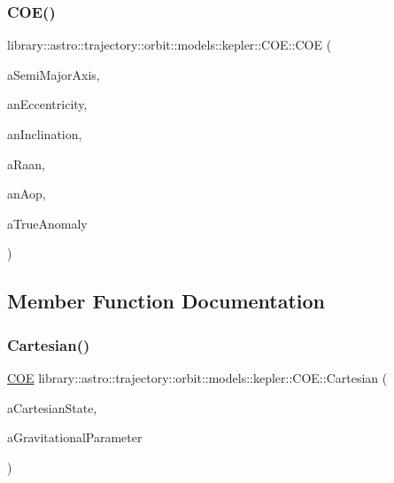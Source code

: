 \subsubsection{\texorpdfstring{C\+O\+E()}{COE()}}
{\footnotesize\ttfamily library\+::astro\+::trajectory\+::orbit\+::models\+::kepler\+::\+C\+O\+E\+::\+C\+OE (\begin{DoxyParamCaption}\item[{const Length \&}]{a\+Semi\+Major\+Axis,  }\item[{const Real \&}]{an\+Eccentricity,  }\item[{const Angle \&}]{an\+Inclination,  }\item[{const Angle \&}]{a\+Raan,  }\item[{const Angle \&}]{an\+Aop,  }\item[{const Angle \&}]{a\+True\+Anomaly }\end{DoxyParamCaption})}



\subsection{Member Function Documentation}
\mbox{\label{classlibrary_1_1astro_1_1trajectory_1_1orbit_1_1models_1_1kepler_1_1_c_o_e_a776a2b7587c3505cf1e063a338c4a5c6}} 
\subsubsection{\texorpdfstring{Cartesian()}{Cartesian()}}
{\footnotesize\ttfamily \hyperlink{classlibrary_1_1astro_1_1trajectory_1_1orbit_1_1models_1_1kepler_1_1_c_o_e}{C\+OE} library\+::astro\+::trajectory\+::orbit\+::models\+::kepler\+::\+C\+O\+E\+::\+Cartesian (\begin{DoxyParamCaption}\item[{const \hyperlink{classlibrary_1_1astro_1_1trajectory_1_1orbit_1_1models_1_1kepler_1_1_c_o_e_ac51b1d86203092966abcebb32f312ff4}{C\+O\+E\+::\+Cartesian\+State} \&}]{a\+Cartesian\+State,  }\item[{const Derived \&}]{a\+Gravitational\+Parameter }\end{DoxyParamCaption})\hspace{0.3cm}{\ttfamily [static]}}

